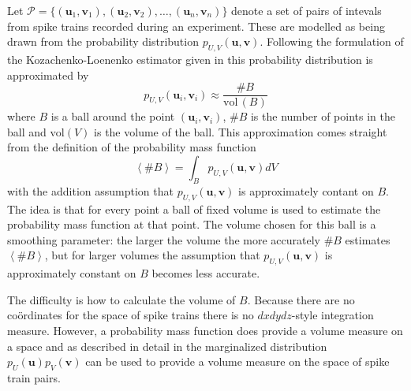 \documentclass[12pt]{article}
\renewcommand{\u}{\mathbf{u}}
\renewcommand{\v}{\mathbf{v}}
\begin{document}
Let $ \mathcal{P}=\{(\u_1,\v_1),(\u_2,\v_2),\ldots,(\u_n,\v_n)\} $
denote a set of pairs of intevals from spike trains recorded during an
experiment. These are modelled as being drawn from the probability
distribution $p_{U,V}(\u,\v)$. Following the formulation of the
Kozachenko-Loenenko estimator given in \citet{Houghton2015} this
probability distribution is approximated by
\begin{equation}
 p_{U,V}(\u_i,\v_i)\approx\frac{\#B}{\mbox{vol}\,(B)}
\end{equation}
where $B$ is a ball around the point $(\u_i,\v_i)$, $\#B$ is the number of
points in the ball and $\mbox{vol}(V)$ is the volume of the ball. This
approximation comes straight from the definition of the probability mass function
\begin{equation}
\left\langle \#B\right\rangle = \int_B p_{U,V}(\u,\v)dV
\end{equation}
with the addition assumption that $p_{U,V}(\u,\v)$ is approximately
contant on $B$. The idea is that for every point a ball of fixed
volume is used to estimate the probability mass function at that
point. The volume chosen for this ball is a smoothing parameter: the
larger the volume the more accurately $\#B$ estimates $\left\langle
\#B\right\rangle$, but for larger volumes the assumption that
$p_{U,V}(\u,\v)$ is approximately constant on $B$ becomes less
accurate.

The difficulty is how to calculate the volume of $B$. Because there
are no co\"{o}rdinates for the space of spike trains there is no
$dxdydz$-style integration measure. However, a probability
mass function does provide a volume measure on a space and as
described in detail in \citet{Houghton2015} the marginalized
distribution $p_U(\u)p_V(\v)$ can be used to provide a volume measure
on the space of spike train pairs.
\end{document}
